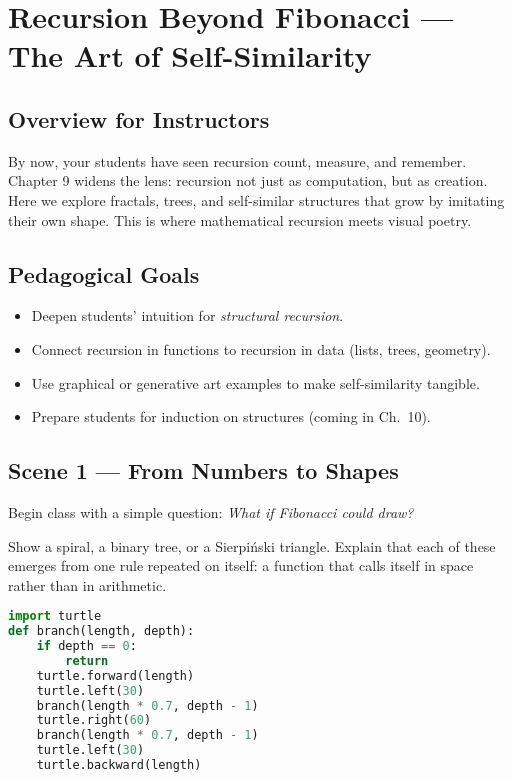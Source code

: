 \chapter{Recursion Beyond Fibonacci — The Art of Self-Similarity}
\label{ch:recursion-beyond-fibonacci-solution}

\section*{Overview for Instructors}
By now, your students have seen recursion count, measure, and remember.
Chapter 9 widens the lens: recursion not just as computation, but as creation.
Here we explore fractals, trees, and self-similar structures that grow by
imitating their own shape.  This is where mathematical recursion meets visual poetry.

\section{Pedagogical Goals}
\begin{itemize}
  \item Deepen students’ intuition for \emph{structural recursion}.
  \item Connect recursion in functions to recursion in data (lists, trees, geometry).
  \item Use graphical or generative art examples to make self-similarity tangible.
  \item Prepare students for induction on structures (coming in Ch.~10).
\end{itemize}

\section{Scene 1 — From Numbers to Shapes}
Begin class with a simple question:  
\textit{What if Fibonacci could draw?}

Show a spiral, a binary tree, or a Sierpiński triangle.
Explain that each of these emerges from one rule repeated on itself:
a function that calls itself in space rather than in arithmetic.

\begin{lstlisting}[language=Python,caption={Recursive tree drawing with Turtle}]
import turtle
def branch(length, depth):
    if depth == 0:
        return
    turtle.forward(length)
    turtle.left(30)
    branch(length * 0.7, depth - 1)
    turtle.right(60)
    branch(length * 0.7, depth - 1)
    turtle.left(30)
    turtle.backward(length)
\end{lstlisting}

